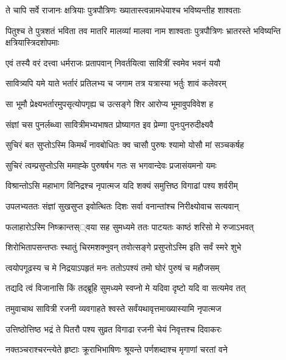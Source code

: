 \twolineshloka
{ते चापि सर्वे राजानः क्षत्रियाः पुत्रपौत्रिणः}
{ख्यातास्त्वन्नामधेयाश्च भविष्यन्तीह शाश्वताः}


\threelineshloka
{पितुश्च ते पुत्रशतं भविता तव मातरि}
{मालव्यां मालवा नाम शाश्वताः पुत्रपौत्रिणः}
{भ्रातरस्ते भविष्यन्ति क्षत्रियास्त्रिदशोपमाः}


\twolineshloka
{एवं तस्यै वरं दत्त्वा धर्मराजः प्रतापवान्}
{निवर्तयित्वा सावित्रीं स्वमेव भवनं ययौ}


\twolineshloka
{सावित्र्यपि यमे याते भर्तारं प्रतिलभ्य च}
{जगाम तत्र यत्रास्या भर्तुः शावं कलेवरम्}


\twolineshloka
{सा भूमौ प्रेक्ष्यभर्तारमुपसृत्योपगृह्य च}
{उत्सङ्गे शिर आरोप्य भूमावुपविवेश ह}


\twolineshloka
{संज्ञां चस पुनर्लब्ध्वा सावित्रीमभ्यभाषत}
{प्रोष्यागत इव प्रेम्णा पुनःपुनरुदीक्ष्यवै}


\twolineshloka
{सुचिरं बत सुप्तोऽस्मि किमर्थं नावबोधितः}
{क्व चासौ पुरुषः श्यामो योसौ मां सञ्चकर्षह}




\twolineshloka
{सुचिरं त्वम्प्रसुप्तोऽसि ममाह्के पुरुषर्षभ}
{गतः स भगवान्देवः प्रजासंयमनो यमः}


\twolineshloka
{विश्रान्तोऽसि महाभाग विनिद्रश्च नृपात्मज}
{यदि शक्यं समुत्तिष्ठ विगाढां पश्य शर्वरीम्}




\twolineshloka
{उपलभ्यततः संज्ञां सुखसुप्त इवोत्थितः}
{दिशः सर्वा वनान्तांश्च निरीक्ष्योवाच सत्यवान्}


\twolineshloka
{फलाहारोऽस्मि निष्क्रान्तस््वया सह सुमध्यमे}
{ततः पाटयतः काष्ठं शरिसो मे रुजाऽभवत्}


\twolineshloka
{शिरोभितापसन्तप्तः स्थातुं चिरमशक्नुवन्}
{तवोत्सङ्गे प्रसुप्तोऽस्मि इति सर्वं स्मरे शुभे}


\twolineshloka
{त्वयोपगूढस्य च मे निद्रयाऽपहृतं मनः}
{ततोऽपश्यं तमो घोरं पुरुषं च महौजसम्}


\twolineshloka
{तद्यदि त्वं विजानासि किं तद्ब्रूहि सुमध्यमे}
{स्वप्नो मे यदिवा दृष्टो यदि वा सत्यमेव तत्}


\twolineshloka
{तमुवाचाथ सावित्री रजनी व्यवगाहते}
{श्वस्ते सर्वंयथावृत्तमाख्यास्यामि नृपात्मज}


\twolineshloka
{उत्तिष्ठोत्तिष्ठ भद्रं ते पितरौ पश्य सुव्रत}
{विगाढा रजनी चेयं निवृत्तश्च दिवाकरः}


\twolineshloka
{नक्तञ्चराश्चरन्त्येते हृष्टाः क्रूराभिभाषिणः}
{श्रूयन्ते पर्णशब्दाश्च मृगाणां चरतां वने}


